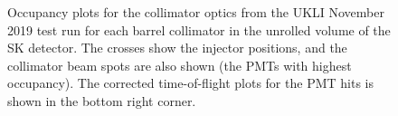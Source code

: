 \begin{figure}
    \centering
    
    \caption{Occupancy plots for the collimator optics from the UKLI November 2019 test run for each barrel collimator in the unrolled volume of the SK detector. The crosses show the injector positions, and the collimator beam spots are also shown (the PMTs with highest occupancy). The corrected time-of-flight plots for the PMT hits is shown in the bottom right corner.}
    \label{fig:occupancy_coll} 
     \hfill
     \par
     \hfill

\end{figure}
